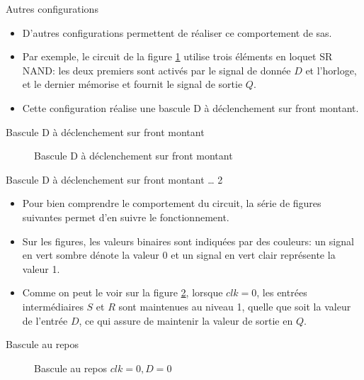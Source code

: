 \documentclass[presentation]{beamer}
\begin{document}
\begin{frame}[label={sec:org0b46baf}]{Autres configurations}
\begin{itemize}
\item D'autres configurations permettent de réaliser ce comportement de sas.

\item Par exemple, le circuit de la figure \ref{fig:org6632263} utilise trois éléments en loquet SR NAND: les deux premiers sont activés par le signal de donnée \(D\) et l'horloge, et le dernier mémorise et fournit le signal de sortie \(Q\).

\item Cette configuration réalise une bascule D à déclenchement sur front montant.
\end{itemize}
\end{frame}

\begin{frame}[label={sec:orgfd1d583}]{Bascule D à déclenchement sur front montant}
\begin{figure}[htbp]
\centering

\caption{\label{fig:org6632263}Bascule D à déclenchement sur front montant}
\end{figure}
\end{frame}

\begin{frame}[label={sec:orgad4e92e}]{Bascule D à déclenchement sur front montant \ldots{} 2}
\begin{itemize}
\item Pour bien comprendre le comportement du circuit, la série de figures suivantes permet d'en suivre le fonctionnement.

\item Sur les figures, les valeurs binaires sont indiquées par des couleurs: un signal en vert sombre dénote la valeur 0 et un signal en vert clair représente la valeur 1.

\item Comme on peut le voir sur la figure \ref{fig:orgf2ffc39}, lorsque \(clk = 0\), les entrées intermédiaires \(S\) et \(R\) sont maintenues au niveau 1, quelle que soit la valeur de l'entrée \(D\), ce qui assure de maintenir la valeur de sortie en \(Q\).
\end{itemize}
\end{frame}

\begin{frame}[label={sec:orgbe00c7d}]{Bascule au repos}
\begin{figure}[htbp]
\centering

\caption{\label{fig:orgf2ffc39}Bascule au repos  \(clk = 0, D=0\)}
\end{figure}
\end{frame}
\end{document}
